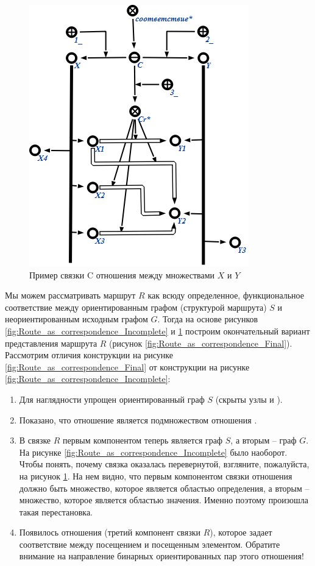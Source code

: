 \begin{figure}[h!]
  \centering
  \includegraphics[scale=0.8]{images/2/Relation_Correspondence_example}
  \caption{Пример связки C отношения  между
    множествами $X$ и $Y$}
  \label{fig:Relation_Correspondence_example}
\end{figure}

Мы можем рассматривать маршрут $R$ как всюду определенное,
функциональное соответствие между ориентированным графом (структурой
маршрута) $S$ и неориентированным исходным графом $G$.  Тогда на
основе рисунков \ref{fig:Route_as_correspondence_Incomplete} и
\ref{fig:Relation_Correspondence_example} построим окончательный
вариант представления маршрута $R$ (рисунок
\ref{fig:Route_as_correspondence_Final}). Рассмотрим отличия
конструкции на рисунке \ref{fig:Route_as_correspondence_Final} от
конструкции на рисунке \ref{fig:Route_as_correspondence_Incomplete}:

\begin{enumerate}
\item Для наглядности упрощен ориентированный граф $S$ (скрыты узлы
   и ).
\item Показано, что отношение  является подмножеством
  отношения .
\item В связке $R$ первым компонентом теперь является граф $S$, а
  вторым – граф $G$. На рисунке
  \ref{fig:Route_as_correspondence_Incomplete} было наоборот. Чтобы
  понять, почему связка оказалась перевернутой, взгляните, пожалуйста,
  на рисунок \ref{fig:Relation_Correspondence_example}. На нем видно,
  что первым компонентом связки отношения  должно
  быть множество, которое является областью определения, а вторым –
  множество, которое является областью значения. Именно поэтому
  произошла такая перестановка.
\item Появилось отношения (третий компонент связки $R$), которое задает
  соответствие между посещением и посещенным элементом. Обратите
  внимание на направление бинарных ориентированных пар этого
  отношения!
\end{enumerate}

